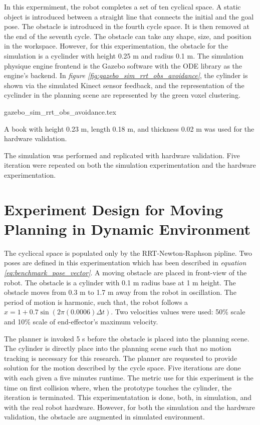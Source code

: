 {In this expermiment, the robot completes a set of ten cyclical space. 
A static object is introduced between a straight line that connects
the initial and the goal pose. 
The obstacle is introduced in the fourth cycle space. It is then removed at
the end of the seventh cycle. The obstacle can take any shape, size, and
position in
the workspace. However,
for this experimentation, the obstacle for the simulation is a cyclinder with
height 0.25 m and radius 0.1 m. The simulation physique engine frontend is
the Gazebo software with the ODE library as the engine's backend. In 
\textit{figure \ref{fig:gazebo_sim_rrt_obs_avoidance}}, the cylinder is
shown via the simulated Kinect sensor feedback, and the representation
of the cyclinder in the planning scene are represented by the green
voxel clustering. 

{gazebo_sim_rrt_obs_avoidance.tex}

A book with height 0.23 m, length 0.18 m, and 
thickness 0.02 m was used for the hardware validation.

The simulation was performed and replicated with hardware validation. Five
iteration were repeated on both the simulation experimentation and
the hardware experimentation.

\section{Experiment Design for Moving Planning in Dynamic Environment}
The cycliccal space is populated only by the RRT-Newton-Raphson pipline.
Two poses are defined in this experimentation which
has been described in \textit{equation \ref{eq:benchmark_pose_vector}}.
A moving obstacle are placed in front-view of the robot. The obstacle
is a cylinder with 0.1 m radius base at 1 m height. 
The obstacle moves from 0.3 m to 1.7 m away from the robot
in oscillation. The period of motion is harmonic, such that, 
the robot follows a $x=1+0.7\sin(2\pi(0.0006)\Delta t)$. Two velocities 
values were used: 50\% scale and 10\% scale of end-effector's maximum velocity.

The planner is invoked 5 s before the obstacle is placed 
into the planning scene. The cylinder
is directly place into the planning scene such that no motion 
tracking is necessary for this research. The planner are requested to
provide solution for the motion described by the cycle space. 
Five iterations are done with each given a five minutes runtime. The metric
use for this experiment is the time on first collision where,
when the prototype touches the cylinder, the iteration is terminated. 
This experimentatation
is done, both, in simulation, and with
the real robot hardware. However, for both the simulation and the hardware
validation, the obstacle are augmented in simulated environment.

}
